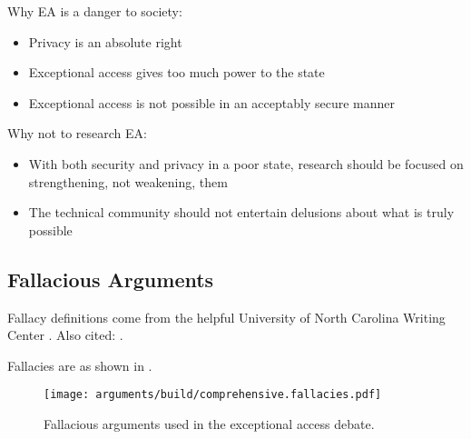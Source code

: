 Why EA is a danger to society:
\begin{itemize}
    \item Privacy is an absolute right
    \item Exceptional access gives too much power to the state
    \item Exceptional access is not possible in an acceptably secure manner
\end{itemize}

Why not to research EA:
\begin{itemize}
    \item With both security and privacy in a poor state, research should be focused on strengthening, not weakening,
            them
    \item The technical community should not entertain delusions about what is truly possible
\end{itemize}

\subsection{Fallacious Arguments}

Fallacy definitions come from the helpful University of North Carolina Writing Center \cite{unc_2020}. Also cited:
\cite{hanna_2019}.

Fallacies are as shown in .

\begin{sidewaysfigure}[h]
    \centering\CaptionFontSize
    \texttt{[image: arguments/build/comprehensive.fallacies.pdf]}
    \caption[Fallacious Arguments]{Fallacious arguments used in the exceptional access debate.}
    \label{fig-args-fallacies}
\end{sidewaysfigure}

